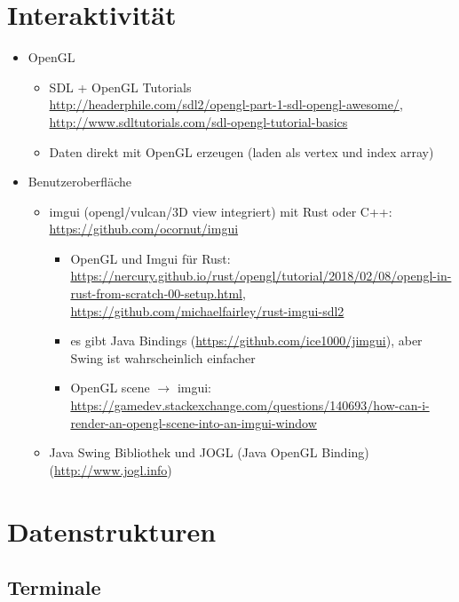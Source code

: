 \section{Interaktivität}

\begin{itemize}
 \item OpenGL
 \begin {itemize}
  \item SDL + OpenGL Tutorials \\ \url{http://headerphile.com/sdl2/opengl-part-1-sdl-opengl-awesome/}, \\ \url{http://www.sdltutorials.com/sdl-opengl-tutorial-basics}
  \item Daten direkt mit OpenGL erzeugen (laden als vertex und index array)
 \end {itemize}

 \item Benutzeroberfläche
 \begin{itemize}
  \item imgui (opengl/vulcan/3D view integriert) mit Rust oder C++: \url{https://github.com/ocornut/imgui}
  
  \begin{itemize}
   \item OpenGL und Imgui für Rust: \url{https://nercury.github.io/rust/opengl/tutorial/2018/02/08/opengl-in-rust-from-scratch-00-setup.html}, \url{https://github.com/michaelfairley/rust-imgui-sdl2}
   \item es gibt Java Bindings (\url{https://github.com/ice1000/jimgui}), aber Swing ist wahrscheinlich einfacher
   \item OpenGL scene $\rightarrow$ imgui: \url{https://gamedev.stackexchange.com/questions/140693/how-can-i-render-an-opengl-scene-into-an-imgui-window}
  \end{itemize}

  
  \item Java Swing Bibliothek und JOGL (Java OpenGL Binding) (\url{http://www.jogl.info})
 \end{itemize}
\end{itemize}

\section{Datenstrukturen}

\subsection{Terminale}

